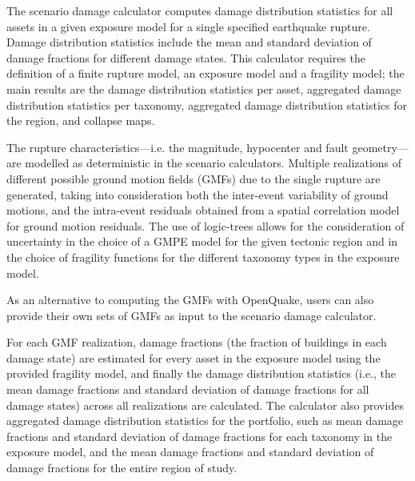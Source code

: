 The scenario damage calculator computes damage distribution statistics for all assets in a given exposure model for a single specified earthquake rupture. Damage distribution statistics include the mean and standard deviation of damage fractions for different damage states. This calculator requires the definition of a finite rupture model, an exposure model and a fragility model; the main results are the damage distribution statistics per asset, aggregated damage distribution statistics per taxonomy, aggregated damage distribution statistics for the region, and collapse maps.

The rupture characteristics—i.e. the magnitude, hypocenter and fault geometry—are modelled as deterministic in the scenario calculators. Multiple realizations of different possible ground motion fields (GMFs) due to the single rupture are generated, taking into consideration both the inter-event variability of ground motions, and the intra-event residuals obtained from a spatial correlation model for ground motion residuals. The use of logic-trees allows for the consideration of uncertainty in the choice of a GMPE model for the given tectonic region and in the choice of fragility functions for the different taxonomy types in the exposure model.

As an alternative to computing the GMFs with OpenQuake, users can also provide their own sets of GMFs as input to the scenario damage calculator.

For each GMF realization, damage fractions (the fraction of buildings in each damage state) are estimated for every asset in the exposure model using the provided fragility model, and finally the damage distribution statistics (i.e., the mean damage fractions and standard deviation of damage fractions for all damage states) across all realizations are calculated. The calculator also provides aggregated damage distribution statistics for the portfolio, such as mean damage fractions and standard deviation of damage fractions for each taxonomy in the exposure model, and the mean damage fractions and standard deviation of damage fractions for the entire region of study.